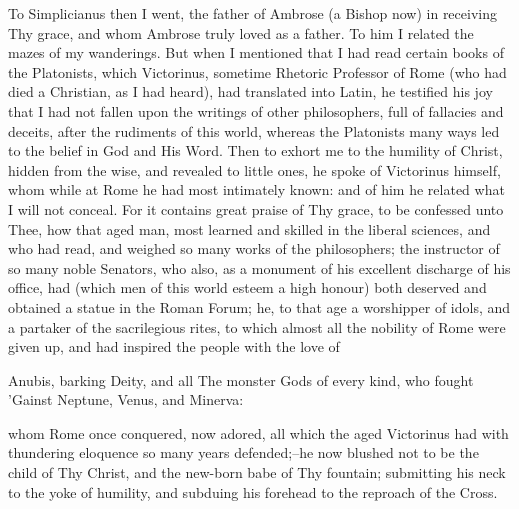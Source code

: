 \documentclass[b5paper,openright,12pt,twoside]{book}
\begin{document}
To Simplicianus then I went, the father of Ambrose (a Bishop now) in
receiving Thy grace, and whom Ambrose truly loved as a father. To him I
related the mazes of my wanderings. But when I mentioned that I had read
certain books of the Platonists, which Victorinus, sometime Rhetoric
Professor of Rome (who had died a Christian, as I had heard), had
translated into Latin, he testified his joy that I had not fallen upon
the writings of other philosophers, full of fallacies and deceits, after
the rudiments of this world, whereas the Platonists many ways led to the
belief in God and His Word. Then to exhort me to the humility of
Christ, hidden from the wise, and revealed to little ones, he spoke of
Victorinus himself, whom while at Rome he had most intimately known: and
of him he related what I will not conceal. For it contains great praise
of Thy grace, to be confessed unto Thee, how that aged man, most learned
and skilled in the liberal sciences, and who had read, and weighed
so many works of the philosophers; the instructor of so many noble
Senators, who also, as a monument of his excellent discharge of his
office, had (which men of this world esteem a high honour) both deserved
and obtained a statue in the Roman Forum; he, to that age a worshipper
of idols, and a partaker of the sacrilegious rites, to which almost all
the nobility of Rome were given up, and had inspired the people with the
love of

         Anubis, barking Deity, and all
         The monster Gods of every kind, who fought
         'Gainst Neptune, Venus, and Minerva:

whom Rome once conquered, now adored, all which the aged Victorinus had
with thundering eloquence so many years defended;--he now blushed not
to be the child of Thy Christ, and the new-born babe of Thy fountain;
submitting his neck to the yoke of humility, and subduing his forehead
to the reproach of the Cross.
\end{document}
